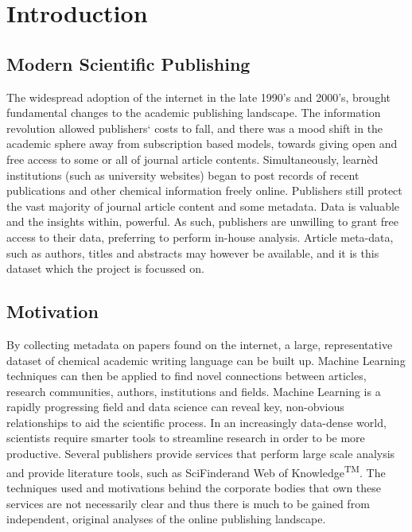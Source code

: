 \chapter{Introduction}
\section{Modern Scientific Publishing}
The widespread adoption of the internet in the late 1990’s and 2000’s, brought  fundamental changes to the academic publishing landscape. The information revolution allowed publishers` costs to fall, and there was a mood shift in the academic sphere away from subscription based models, towards giving open and free access to some or all of journal article contents.
Simultaneously, learn\`{e}d institutions (such as university websites) began to post records of recent publications and other chemical information freely online. 
Publishers still protect the vast majority of journal article content and some metadata. Data is valuable and the insights within, powerful. As such, publishers are unwilling to grant free access to their data, preferring to perform in-house analysis. Article meta-data, such as authors, titles and abstracts may however be available, and it is this dataset which the project is focussed on. 
\section{Motivation}
By collecting metadata on papers found on the internet, a large, representative dataset of chemical academic writing language can be built up. Machine Learning techniques can then be applied to find novel connections between articles, research communities, authors, institutions and fields. Machine Learning is a rapidly progressing field and data science can reveal key, non-obvious relationships to aid the scientific process. In an increasingly data-dense world, scientists require smarter tools to streamline research in order to be more productive. Several publishers provide services that perform large scale analysis and provide literature tools, such as SciFinder\textregistered and Web of Knowledge\textsuperscript{TM}. The techniques used and motivations behind the corporate bodies that own these services are not necessarily clear and thus there is much to be gained from independent, original analyses of the online publishing landscape. 

